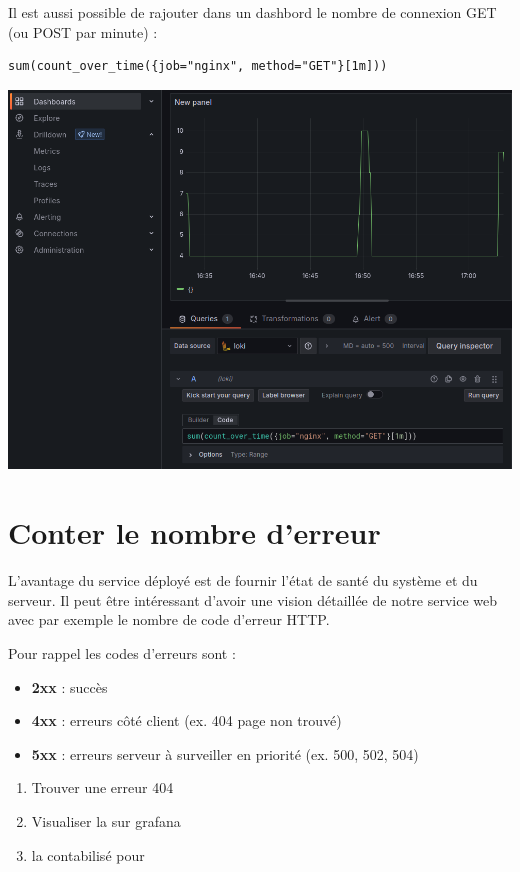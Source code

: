 \documentclass[french, 12pt]{article}%
\newcommand{\itemE}{\item[$\bullet$]}
\begin{document}
Il est aussi possible de rajouter dans un dashbord le nombre de connexion GET (ou POST par minute) : 
\begin{lstlisting}[style=commande]
sum(count_over_time({job="nginx", method="GET"}[1m]))
\end{lstlisting}
\begin{center}
\includegraphics[scale=0.5]{./ressource/grafanaNombre_delelement.png}
\end{center}


\section{Conter le nombre d'erreur}

L'avantage du service déployé est de fournir l'état de santé du système et du serveur. Il peut être intéressant d'avoir une vision détaillée de notre service web avec par exemple le nombre de code d'erreur HTTP. 

Pour rappel les codes d'erreurs sont : 

\begin{itemize}
\itemE \textbf{2xx} : succès
\itemE \textbf{4xx} : erreurs côté client (ex. 404 page non trouvé)
\itemE \textbf{5xx} : erreurs serveur à surveiller en priorité (ex. 500, 502, 504)
\end{itemize}

\begin{enumerate}
\item Trouver une erreur 404
\item Visualiser la sur grafana
\item la contabilisé pour 
\end{enumerate}
\end{document}

